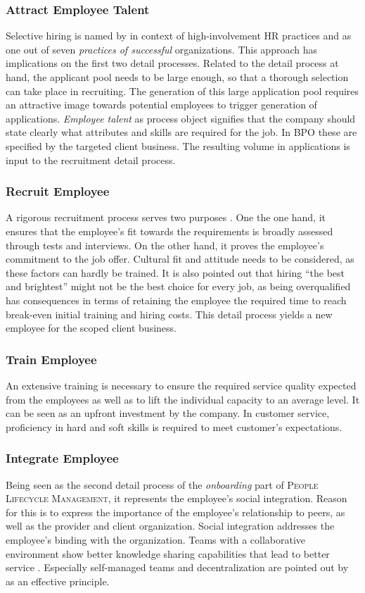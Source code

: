 	\subsubsection{Attract Employee Talent}
		Selective hiring is named by \cite{Batt2002} in context of high-involvement HR practices and \cite{pfeffer1998seven} as one out of seven \textit{practices of successful} organizations. This approach has implications on the first two detail processes. Related to the detail process at hand, the applicant pool needs to be large enough, so that a thorough selection can take place in recruiting. The generation of this large application pool requires an attractive image towards potential employees to trigger generation of applications. \textit{Employee talent} as process object signifies that the company should state clearly what attributes and skills are required for the job. In \acrshort{BPO} these are specified by the targeted client business. The resulting volume in applications is input to the recruitment detail process. 
		
	\subsubsection{Recruit Employee}
		A rigorous recruitment process serves two purposes \citep[]{pfeffer1998seven}. One the one hand, it ensures that the employee's fit towards the requirements is broadly assessed through tests and interviews. On the other hand, it proves the employee's commitment to the job offer. Cultural fit and attitude needs to be considered, as these factors can hardly be trained. It is also pointed out that hiring \enquote{the best and brightest} might not be the best choice for every job, as being overqualified has consequences in terms of retaining the employee the required time to reach break-even \wrt initial training and hiring costs. This detail process yields a new employee for the scoped client business.
	\subsubsection{Train Employee}
		An extensive training is necessary to ensure the required service quality expected from the employees as well as to lift the individual capacity to an average level. It can be seen as an upfront investment by the company. In customer service, proficiency in hard and soft skills is required to meet customer's expectations. 
	\subsubsection{Integrate Employee}
		Being seen as the second detail process of the \textit{onboarding} part of \textsc{People Lifecycle Management}, it represents the employee's social integration. Reason for this is to express the importance of the employee's relationship to peers, as well as the provider and client organization. Social integration addresses the employee's binding with the organization. Teams with a collaborative environment show better knowledge sharing capabilities that lead to better service \citep{Batt_2002}. Especially self-managed teams and decentralization are pointed out by \cite{pfeffer1998seven} as an effective principle. 
		
